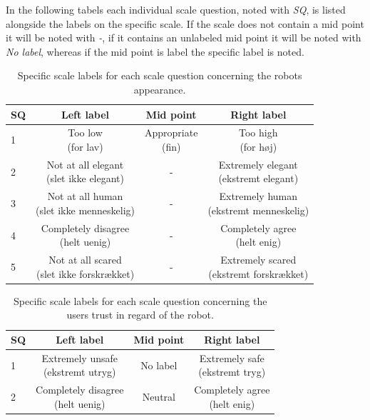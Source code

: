 In the following tabels each individual scale question, noted with \textit{SQ}, is listed alongside the labels on the specific scale. If the scale does not contain a mid point it will be noted with \textit{-}, if it contains an unlabeled mid point it will be noted with \textit{No label}, whereas if the mid point is label the specific label is noted. 
%
\begin{table}[H]
	\centering
\caption{Specific scale labels for each scale question concerning the robots appearance.}
	\label{tab:AppearanceScale} 
	\begin{tabular}{l|c|c|c}
		SQ     & Left label & Mid point & Right label \\\hline
		1   & \makecell{Too low \\(for lav)}  & \makecell{Appropriate \\(fin)} & \makecell{Too high \\(for høj)}        \\\hline
		2   & \makecell{Not at all elegant \\(slet ikke elegant)} & - & \makecell{Extremely elegant \\(ekstremt elegant)}         \\\hline
		3   & \makecell{Not at all human \\(slet ikke menneskelig)} & - & \makecell{Extremely human \\(ekstremt menneskelig)}         \\\hline
	 	4   & \makecell{Completely disagree \\(helt uenig)} & - & \makecell{Completely agree \\(helt enig)}         \\\hline
		5   & \makecell{Not at all scared \\(slet ikke forskrækket)} & -  & \makecell{Extremely scared \\(ekstremt forskrækket)}           
	\end{tabular}        
\end{table}
\noindent
%
%
\begin{table}[H]
	\centering
\caption{Specific scale labels for each scale question concerning the users trust in regard of the robot.}
	\label{tab:TrustScale} 
	\begin{tabular}{l|c|c|c}
		SQ  & Left label & Mid point & Right label \\\hline
		1   & \makecell{Extremely unsafe\\ (ekstremt utryg)} & No label & \makecell{Extremely safe \\(ekstremt tryg)}          \\\hline
		2   & \makecell{Completely disagree \\(helt uenig)} & Neutral &\makecell{Completely agree \\(helt enig)} 
	\end{tabular}        
\end{table}
